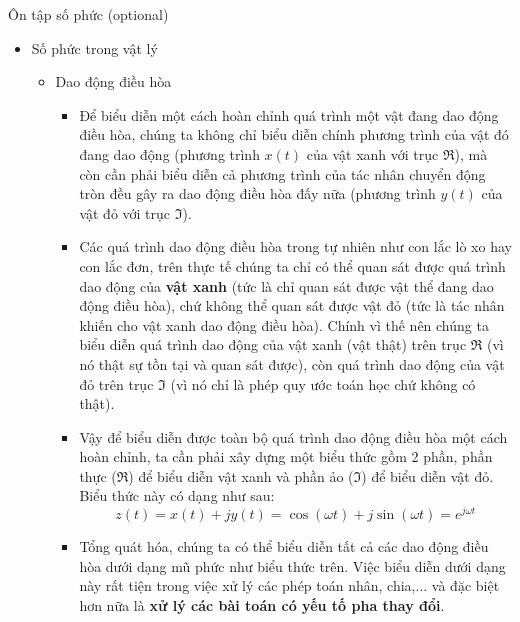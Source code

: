 \documentclass[8pt]{beamer}
\begin{document}
\begin{frame}{Ôn tập số phức (optional)}
\begin{itemize}
	\item Số phức trong vật lý
		\begin{itemize}
			\item Dao động điều hòa
				\begin{itemize}
					\item Để biểu diễn một cách hoàn chỉnh quá trình một vật đang dao động điều hòa, chúng ta không chỉ biểu diễn chính phương trình của vật đó đang dao động (phương trình $x(t)$ của vật xanh với trục $\Re$), mà còn cần phải biểu diễn cả phương trình của tác nhân chuyển động tròn đều gây ra dao động điều hòa đấy nữa (phương trình $y(t)$ của vật đỏ với trục $\Im$).
					\item Các quá trình dao động điều hòa trong tự nhiên như con lắc lò xo hay con lắc đơn, trên thực tế chúng ta chỉ có thể quan sát được quá trình dao động của \textbf{vật xanh} (tức là chỉ quan sát được vật thể đang dao động điều hòa), chứ không thể quan sát được \alert{vật đỏ} (tức là tác nhân khiến cho vật xanh dao động điều hòa). Chính vì thế nên chúng ta biểu diễn quá trình dao động của vật xanh (vật thật) trên trục $\Re$ (vì nó thật sự tồn tại và quan sát được), còn quá trình dao động của vật đỏ trên trục $\Im$ (vì nó chỉ là phép quy ước toán học chứ không có thật).
					\item Vậy để biểu diễn được toàn bộ quá trình dao động điều hòa một cách \alert{hoàn chỉnh}, ta cần phải xây dựng một biểu thức gồm 2 phần, phần thực ($\Re$) để biểu diễn vật xanh và phần ảo ($\Im$) để biểu diễn vật đỏ. Biểu thức này có dạng như sau:
						$$z(t)=x(t)+jy(t)=\cos{(\omega t)}+j\sin{(\omega t)}=e^{j\omega t}$$
					\item Tổng quát hóa, chúng ta có thể biểu diễn tất cả các dao động điều hòa dưới dạng mũ phức như biểu thức trên. Việc biểu diễn dưới dạng này rất tiện trong việc xử lý các phép toán nhân, chia,... và đặc biệt hơn nữa là \textbf{xử lý các bài toán có yếu tố pha thay đổi}. 
				\end{itemize}
		\end{itemize}
	\end{itemize}
\end{frame}
\end{document}
